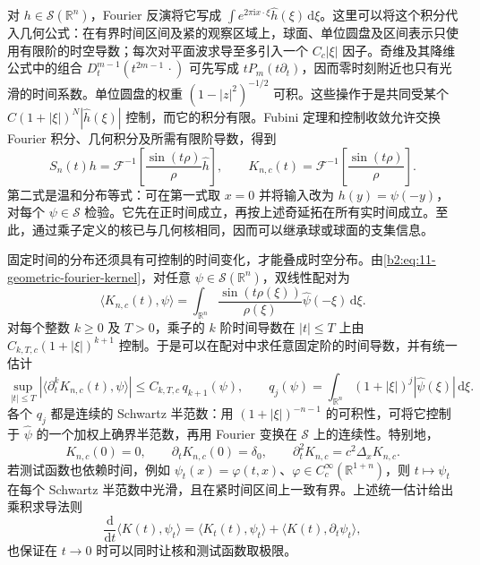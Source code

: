 对 \(h\in\mathcal S(\mathbb R^n)\)，Fourier 反演将它写成 \(\int e^{2\pi\mathrm{i}x\cdot\xi}\widehat h(\xi)\,\mathrm{d}\xi\)。这里可以将这个积分代入几何公式：在有界时间区间及紧的观察区域上，球面、单位圆盘及区间表示只使用有限阶的时空导数；每次对平面波求导至多引入一个 \(C_c|\xi|\) 因子。奇维及其降维公式中的组合 \(D_t^{m-1}(t^{2m-1}\,\cdot)\) 可先写成 \(tP_m(t\partial_t)\)，因而零时刻附近也只有光滑的时间系数。单位圆盘的权重 \((1-|z|^2)^{-1/2}\) 可积。这些操作于是共同受某个 \(C(1+|\xi|)^N|\widehat h(\xi)|\) 控制，而它的积分有限。Fubini 定理和控制收敛允许交换 Fourier 积分、几何积分及所需有限阶导数，得到
\begin{equation}\label{b2:eq:11-geometric-fourier-kernel}
 S_n(t)h=\mathcal F^{-1}
 \left[\frac{\sin(t\rho)}{\rho}\widehat h\right],\qquad
 K_{n,c}(t)=\mathcal F^{-1}\left[\frac{\sin(t\rho)}{\rho}\right].
\end{equation}
第二式是温和分布等式：可在第一式取 \(x=0\) 并将输入改为 \(h(y)=\psi(-y)\)，对每个 \(\psi\in\mathcal S\) 检验。它先在正时间成立，再按上述奇延拓在所有实时间成立。至此，通过乘子定义的核已与几何核相同，因而可以继承球或球面的支集信息。

\ProseParagraphBreak

固定时间的分布还须具有可控制的时间变化，才能叠成时空分布。由\eqref{b2:eq:11-geometric-fourier-kernel}，对任意 \(\psi\in\mathcal S(\mathbb R^n)\)，双线性配对为
\begin{equation}\label{b2:eq:11-kernel-fourier-pairing}
 \langle K_{n,c}(t),\psi\rangle
 =\int_{\mathbb R^n}\frac{\sin(t\rho(\xi))}{\rho(\xi)}
                 \widehat\psi(-\xi)\,\mathrm{d}\xi.
\end{equation}
对每个整数 \(k\geq0\) 及 \(T>0\)，乘子的 \(k\) 阶时间导数在 \(|t|\leq T\) 上由 \(C_{k,T,c}(1+|\xi|)^{k+1}\) 控制。于是可以在配对中求任意固定阶的时间导数，并有统一估计
\[
 \sup_{|t|\leq T}|\langle\partial_t^kK_{n,c}(t),\psi\rangle|
 \leq C_{k,T,c}\,q_{k+1}(\psi),\qquad
 q_j(\psi)=\int_{\mathbb R^n}(1+|\xi|)^j|\widehat\psi(\xi)|\,\mathrm{d}\xi.
\]
各个 \(q_j\) 都是连续的 Schwartz 半范数：用 \((1+|\xi|)^{-n-1}\) 的可积性，可将它控制于 \(\widehat\psi\) 的一个加权上确界半范数，再用 Fourier 变换在 \(\mathcal S\) 上的连续性。特别地，
\[
 K_{n,c}(0)=0,\qquad \partial_tK_{n,c}(0)=\delta_0,
 \qquad\partial_t^2K_{n,c}=c^2\Delta_xK_{n,c}.
\]
若测试函数也依赖时间，例如 \(\psi_t(x)=\varphi(t,x)\)、\(\varphi\in C_c^\infty(\mathbb R^{1+n})\)，则 \(t\mapsto\psi_t\) 在每个 Schwartz 半范数中光滑，且在紧时间区间上一致有界。上述统一估计给出乘积求导法则
\[
 \frac{\mathrm{d}}{\mathrm{d}t}\langle K(t),\psi_t\rangle
 =\langle K_t(t),\psi_t\rangle+\langle K(t),\partial_t\psi_t\rangle,
\]
也保证在 \(t\to0\) 时可以同时让核和测试函数取极限。

